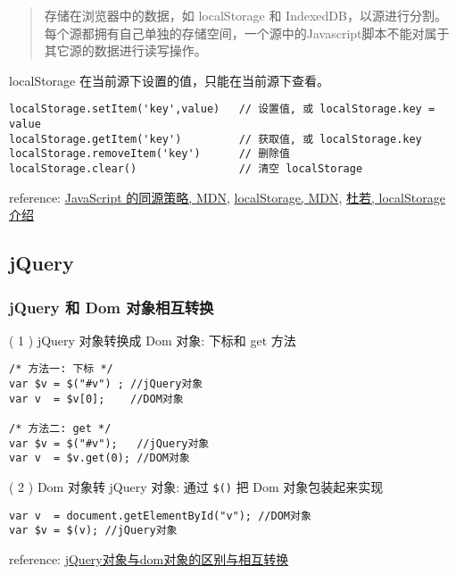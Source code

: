 \begin{quote}
存储在浏览器中的数据，如 localStorage 和 IndexedDB，以源进行分割。每个源都拥有自己单独的存储空间，一个源中的Javascript脚本不能对属于其它源的数据进行读写操作。
\end{quote}

localStorage 在当前源下设置的值，只能在当前源下查看。

\begin{verbatim}localStorage.setItem('key',value)   // 设置值, 或 localStorage.key = value
localStorage.getItem('key')         // 获取值, 或 localStorage.key
localStorage.removeItem('key')      // 删除值
localStorage.clear()                // 清空 localStorage
\end{verbatim}

reference: \href{https://developer.mozilla.org/zh-CN/docs/Web/Security/Same-origin\_policy}{JavaScript 的同源策略, MDN}, \href{https://developer.mozilla.org/en-US/docs/Web/API/Storage/LocalStorage}{localStorage, MDN}, \href{http://wikieswan.github.io/javascript/2015/04/03/html5-api-localstorage/}{杜若, localStorage 介绍}

\subsection{jQuery}\hypertarget{jquery}{}\label{jquery}

\subsubsection{jQuery 和 Dom 对象相互转换}\hypertarget{jquery--dom-}{}\label{jquery--dom-}

( 1 ) jQuery 对象转换成 Dom 对象: 下标和 get 方法

\begin{verbatim}/* 方法一: 下标 */
var $v = $("#v") ; //jQuery对象
var v  = $v[0];    //DOM对象

/* 方法二: get */
var $v = $("#v");   //jQuery对象
var v  = $v.get(0); //DOM对象
\end{verbatim}

( 2 ) Dom 对象转 jQuery 对象: 通过 \texttt{\$()} 把 Dom 对象包装起来实现

\begin{verbatim}var v  = document.getElementById("v"); //DOM对象
var $v = $(v); //jQuery对象
\end{verbatim}

reference: \href{http://segmentfault.com/a/1190000003710344}{jQuery对象与dom对象的区别与相互转换}

